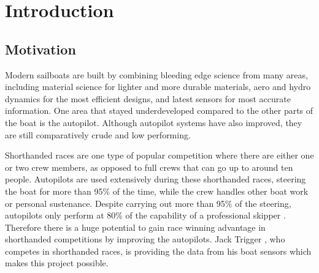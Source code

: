 \documentclass[12pt,twoside]{report}
\date{September 2021}
\begin{document}



\pagestyle{fancy}

\tableofcontents 


\clearpage{\pagestyle{empty}%
}
\fancyhead[LE,RO]{\slshape \rightmark}
\fancyhead[LO,RE]{\slshape \leftmark}


\chapter{Introduction}

\section{Motivation}
Modern sailboats are built by combining bleeding edge science from many areas, including material science for lighter and more durable materials, aero and hydro dynamics for the most efficient designs, and latest sensors for most accurate information. One area that stayed underdeveloped compared to the other parts of the boat is the autopilot. Although autopilot systems have also improved, they are still comparatively crude and low performing.

Shorthanded races are one type of popular competition where there are either one or two crew members, as opposed to full crews that can go up to around ten people. Autopilots are used extensively during these shorthanded races, steering the boat for more than 95\% of the time, while the crew handles other boat work or personal sustenance. Despite carrying out more than 95\% of the steering, autopilots only perform at 80\% of the capability of a professional skipper \cite{roman}. Therefore there is a huge potential to gain race winning advantage in shorthanded competitions by improving the autopilots. Jack Trigger \cite{trigger-racing}, who competes in shorthanded races, is providing the data from his boat sensors which makes this project possible. 
\end{document}
